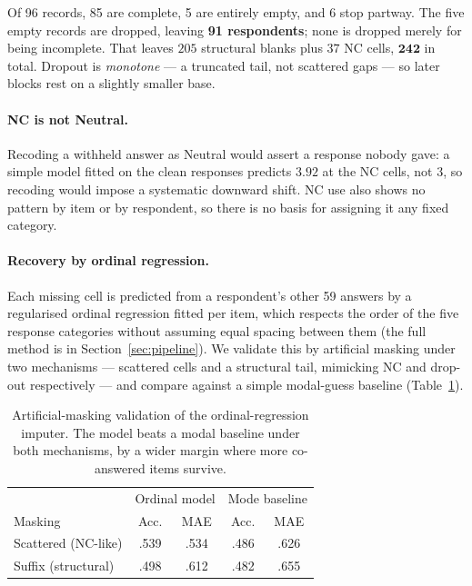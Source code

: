 \documentclass{article}
\begin{document}
Of 96 records, 85 are complete, 5 are entirely empty, and 6 stop partway. The
five empty records are dropped, leaving \textbf{91 respondents}; none is
dropped merely for being incomplete. That leaves $205$ structural blanks plus
$37$ NC cells, $\mathbf{242}$ in total. Dropout is \emph{monotone} --- a
truncated tail, not scattered gaps --- so later blocks rest on a slightly
smaller base.

\paragraph{NC is not Neutral.} Recoding a withheld answer as Neutral would
assert a response nobody gave: a simple model fitted on the clean responses
predicts $3.92$ at the NC cells, not $3$, so recoding would impose a
systematic downward shift. NC use also shows no pattern by item or by
respondent, so there is no basis for assigning it any fixed category.

\paragraph{Recovery by ordinal regression.} Each missing cell is predicted from
a respondent's other 59 answers by a regularised ordinal regression fitted per
item, which respects the order of the five response categories without
assuming equal spacing between them (the full method is in
Section~\ref{sec:pipeline}). We validate this by artificial masking under two
mechanisms --- scattered cells and a structural tail, mimicking NC and
drop-out respectively --- and compare against a simple modal-guess baseline
(Table~\ref{tab:val}).

\begin{table}[t]
\caption{Artificial-masking validation of the ordinal-regression imputer. The
model beats a modal baseline under both mechanisms, by a wider margin where
more co-answered items survive.}
\label{tab:val}
\vskip 0.05in
\begin{center}
\footnotesize
\begin{tabular}{lcccc}
\toprule
& \multicolumn{2}{c}{Ordinal model}
& \multicolumn{2}{c}{Mode baseline} \\
Masking & Acc. & MAE & Acc. & MAE \\
\midrule
Scattered (NC-like) & .539 & .534 & .486 & .626 \\
Suffix (structural) & .498 & .612 & .482 & .655 \\
\bottomrule
\end{tabular}
\end{center}
\vskip -0.1in
\end{table}
\end{document}
